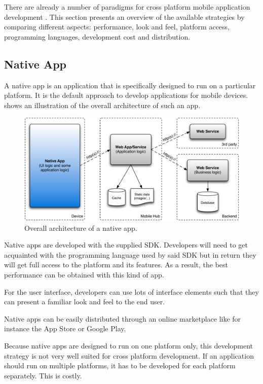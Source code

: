There are already a number of paradigms for cross platform mobile application development \citep{Friese}. This section presents an overview of the available strategies by comparing different aspects: performance, look and feel, platform access, programming languages, development cost and distribution.

\subsection{Native App}

A native app is an application that is specifically designed to run on a particular platform. It is the default approach to develop applications for mobile devices.  shows an illustration of the overall architecture of such an app. 

\begin{figure}[h!]
    \begin{center}
        \includegraphics[width=\textwidth]{figs/native.pdf}
        \caption{
            Overall architecture of a native app. 
        }
        \label{fig:native}
    \end{center}
\end{figure}

Native apps are developed with the supplied SDK. Developers will need to get acquainted with the programming language used by said SDK but in return they will get full access to the platform and its features. As a result, the best performance can be obtained with this kind of app.

For the user interface, developers can use lots of interface elements such that they can present a familiar look and feel to the end user. 

Native apps can be easily distributed through an online marketplace like for instance the App Store or Google Play. 

Because native apps are designed to run on one platform only, this development strategy is not very well suited for cross platform development. If an application should run on multiple platforms, it has to be developed for each platform separately. This is costly.


